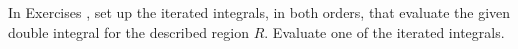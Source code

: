 {\noindent In Exercises}
{, set up the iterated integrals, in both orders, that evaluate the given double integral for the described region $R$. Evaluate one of the iterated integrals.}
